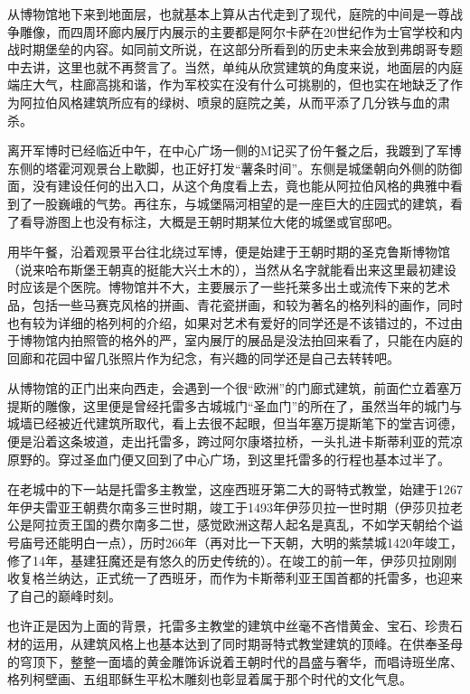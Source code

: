 \documentclass[]{book}
\begin{document}
从博物馆地下来到地面层，也就基本上算从古代走到了现代，庭院的中间是一尊战争雕像，而四周环廊内展厅内展示的主要都是阿尔卡萨在20世纪作为士官学校和内战时期堡垒的内容。如同前文所说，在这部分所看到的历史未来会放到弗朗哥专题中去讲，这里也就不再赘言了。当然，单纯从欣赏建筑的角度来说，地面层的内庭端庄大气，柱廊高挑和谐，作为军校实在没有什么可挑剔的，但也实在地缺乏了作为阿拉伯风格建筑所应有的绿树、喷泉的庭院之美，从而平添了几分铁与血的肃杀。

离开军博时已经临近中午，在中心广场一侧的M记买了份午餐之后，我踱到了军博东侧的塔霍河观景台上歇脚，也正好打发``薯条时间''。东侧是城堡朝向外侧的防御面，没有建设任何的出入口，从这个角度看上去，竟也能从阿拉伯风格的典雅中看到了一股巍峨的气势。再往东，与城堡隔河相望的是一座巨大的庄园式的建筑，看了看导游图上也没有标注，大概是王朝时期某位大佬的城堡或官邸吧。

用毕午餐，沿着观景平台往北绕过军博，便是始建于王朝时期的圣克鲁斯博物馆（说来哈布斯堡王朝真的挺能大兴土木的），当然从名字就能看出来这里最初建设时应该是个医院。博物馆并不大，主要展示了一些托莱多出土或流传下来的艺术品，包括一些马赛克风格的拼画、青花瓷拼画，和较为著名的格列科的画作，同时也有较为详细的格列柯的介绍，如果对艺术有爱好的同学还是不该错过的，不过由于博物馆内拍照管的格外的严，室内展厅的展品是没法拍回来看了，只能在内庭的回廊和花园中留几张照片作为纪念，有兴趣的同学还是自己去转转吧。

从博物馆的正门出来向西走，会遇到一个很``欧洲''的门廊式建筑，前面伫立着塞万提斯的雕像，这里便是曾经托雷多古城城门``圣血门''的所在了，虽然当年的城门与城墙已经被近代建筑所取代，看上去很不起眼，但当年塞万提斯笔下的堂吉诃德，便是沿着这条坡道，走出托雷多，跨过阿尔康塔拉桥，一头扎进卡斯蒂利亚的荒凉原野的。穿过圣血门便又回到了中心广场，到这里托雷多的行程也基本过半了。

在老城中的下一站是托雷多主教堂，这座西班牙第二大的哥特式教堂，始建于1267年伊夫雷亚王朝费尔南多三世时期，竣工于1493年伊莎贝拉一世时期（伊莎贝拉老公是阿拉贡王国的费尔南多二世，感觉欧洲这帮人起名是真乱，不如学天朝给个谥号庙号还能明白一点），历时266年（再对比一下天朝，大明的紫禁城1420年竣工，修了14年，基建狂魔还是有悠久的历史传统的）。在竣工的前一年，伊莎贝拉刚刚收复格兰纳达，正式统一了西班牙，而作为卡斯蒂利亚王国首都的托雷多，也迎来了自己的巅峰时刻。

也许正是因为上面的背景，托雷多主教堂的建筑中丝毫不吝惜黄金、宝石、珍贵石材的运用，从建筑风格上也基本达到了同时期哥特式教堂建筑的顶峰。在供奉圣母的穹顶下，整整一面墙的黄金雕饰诉说着王朝时代的昌盛与奢华，而唱诗班坐席、格列柯壁画、五组耶稣生平松木雕刻也彰显着属于那个时代的文化气息。
\end{document}
